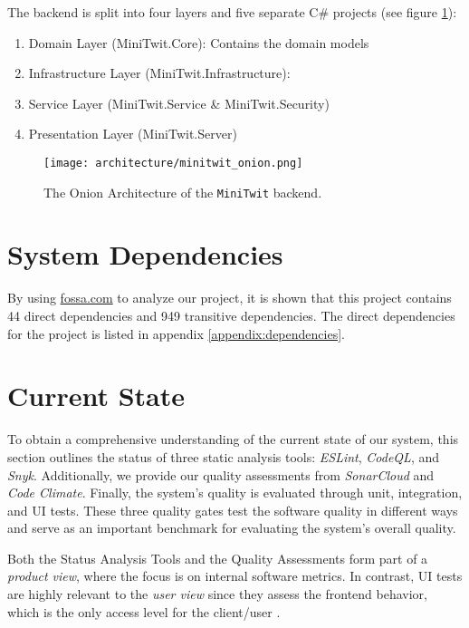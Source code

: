 The backend is split into four layers and five separate C\# projects (see figure \ref{fig:backend-onion}):

\begin{enumerate}
    \item Domain Layer (MiniTwit.Core): Contains the domain models
    \item Infrastructure Layer (MiniTwit.Infrastructure): 
    \item Service Layer (MiniTwit.Service \& MiniTwit.Security)
    \item Presentation Layer (MiniTwit.Server)
\end{enumerate}

\begin{figure}[H]
    \centering
    \texttt{[image: architecture/minitwit\_onion.png]}
    \caption{The Onion Architecture of the \texttt{MiniTwit} backend.}
    \label{fig:backend-onion}
\end{figure}

\section{System Dependencies}
By using \url{fossa.com} to analyze our project, it is shown that this project contains 44 direct dependencies and 949 transitive dependencies. 
The direct dependencies for the project is listed in appendix \ref{appendix:dependencies}. 



\section{Current State}

To obtain a comprehensive understanding of the current state of our system, this section outlines the status of three static analysis tools: \textit{ESLint}, \textit{CodeQL}, and \textit{Snyk}. Additionally, we provide our quality assessments from \textit{SonarCloud} and \textit{Code Climate}. Finally, the system's quality is evaluated through unit, integration, and UI tests. These three quality gates test the software quality in different ways and serve as an important benchmark for evaluating the system's overall quality.

Both the Status Analysis Tools and the Quality Assessments form part of a \textit{product view}, where the focus is on internal software metrics. In contrast, UI tests are highly relevant to the \textit{user view} since they assess the frontend behavior, which is the only access level for the client/user \cite[pp. 13-15]{kitchenham1996software}.

